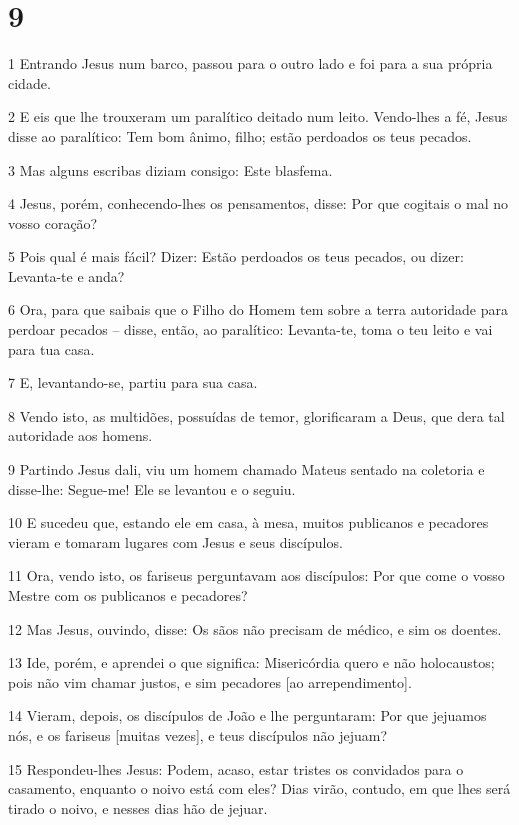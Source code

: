 \chapter{9}

\par 1 Entrando Jesus num barco, passou para o outro lado e foi para a sua própria cidade.
\par 2 E eis que lhe trouxeram um paralítico deitado num leito. Vendo-lhes a fé, Jesus disse ao paralítico: Tem bom ânimo, filho; estão perdoados os teus pecados.
\par 3 Mas alguns escribas diziam consigo: Este blasfema.
\par 4 Jesus, porém, conhecendo-lhes os pensamentos, disse: Por que cogitais o mal no vosso coração?
\par 5 Pois qual é mais fácil? Dizer: Estão perdoados os teus pecados, ou dizer: Levanta-te e anda?
\par 6 Ora, para que saibais que o Filho do Homem tem sobre a terra autoridade para perdoar pecados -- disse, então, ao paralítico: Levanta-te, toma o teu leito e vai para tua casa.
\par 7 E, levantando-se, partiu para sua casa.
\par 8 Vendo isto, as multidões, possuídas de temor, glorificaram a Deus, que dera tal autoridade aos homens.
\par 9 Partindo Jesus dali, viu um homem chamado Mateus sentado na coletoria e disse-lhe: Segue-me! Ele se levantou e o seguiu.
\par 10 E sucedeu que, estando ele em casa, à mesa, muitos publicanos e pecadores vieram e tomaram lugares com Jesus e seus discípulos.
\par 11 Ora, vendo isto, os fariseus perguntavam aos discípulos: Por que come o vosso Mestre com os publicanos e pecadores?
\par 12 Mas Jesus, ouvindo, disse: Os sãos não precisam de médico, e sim os doentes.
\par 13 Ide, porém, e aprendei o que significa: Misericórdia quero e não holocaustos; pois não vim chamar justos, e sim pecadores [ao arrependimento].
\par 14 Vieram, depois, os discípulos de João e lhe perguntaram: Por que jejuamos nós, e os fariseus [muitas vezes], e teus discípulos não jejuam?
\par 15 Respondeu-lhes Jesus: Podem, acaso, estar tristes os convidados para o casamento, enquanto o noivo está com eles? Dias virão, contudo, em que lhes será tirado o noivo, e nesses dias hão de jejuar.
